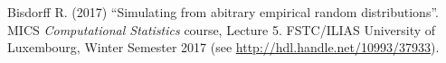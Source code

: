 \begin{thebibliography}{99.}
 Bisdorff R. (2017) ``Simulating from abitrary empirical random distributions''. MICS \emph{Computational Statistics} course, Lecture 5. FSTC/ILIAS University of Luxembourg, Winter Semester 2017 (see \url{http://hdl.handle.net/10993/37933}).


\end{thebibliography}
